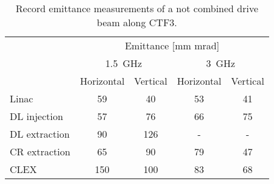 \begin{table}[h]
 \centering
  \begin{tabular}{lcccc}
    \hline
    {\multirow{3}{*}{Location}}& \multicolumn{4}{c}{Emittance [mm mrad]}  \\
                               & \multicolumn{2}{c}{1.5~GHz}  & \multicolumn{2}{c}{3~GHz}           \\
                               & Horizontal   &   Vertical  & Horizontal & Vertical       \\
    \hline \hline
               Linac           &  59   &  40  &  53  &  41     \\
               DL injection    &  57   &  76  &  66  &  75     \\
               DL extraction   &  90   & 126  &   -  &   -     \\
               CR extraction   &  65   &  90  &  79  &  47     \\
               CLEX            & 150   & 100  &  83  &  68     \\
    \hline
  \end{tabular}
\caption{Record emittance measurements of a not combined drive beam along CTF3.}
\label{tab:emittancesummary}
\end{table}
